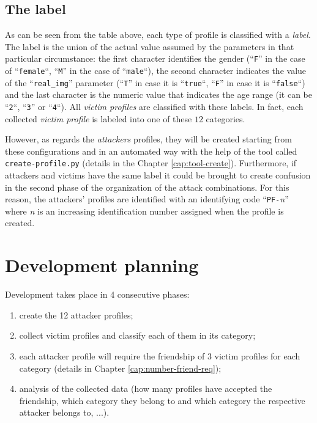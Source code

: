 \subsection*{The label}
As can be seen from the table above, each type of profile is classified with a \textit{label}. The label is the union of the actual value assumed by the parameters in that particular circumstance: the first character identifies the gender (``\texttt{F}'' in the case of ``\texttt{female}``, ``\texttt{M}'' in the case of ``\texttt{male}``), the second character indicates the value of the ``\texttt{real\_img}'' parameter (``\texttt{T}'' in case it is ``\texttt{true}``, ``\texttt{F}'' in case it is ``\texttt{false}``) and the last character is the numeric value that indicates the age range (it can be ``\texttt{2}``, ``\texttt{3}'' or ``\texttt{4}``). All \textit{victim profiles} are classified with these labels. In fact, each collected \textit{victim profile} is labeled into one of these $12$ categories.\par \noindent However, as regards the \textit{attackers} profiles, they will be created starting from these configurations and in an automated way with the help of the tool called \texttt{create-profile.py} (details in the Chapter \ref{cap:tool-create}). Furthermore, if attackers and victims have the same label it could be brought to create confusion in the second phase of the organization of the attack combinations. For this reason, the attackers' profiles are identified with an identifying code ``\texttt{PF-}\textit{n}'' where \textit{n} is an increasing identification number assigned when the profile is created. 

\section{Development planning}
Development takes place in 4 consecutive phases:
\begin{enumerate}
	\item  create the 12 attacker profiles;
	\item  collect victim profiles and classify each of them in its category;
	\item  each attacker profile will require the friendship of 3 victim profiles for each category (details in Chapter \ref{cap:number-friend-req});
	\item  analysis of the collected data (how many profiles have accepted the friendship, which category they belong to and which category the respective attacker belongs to, ...).		
\end{enumerate}

